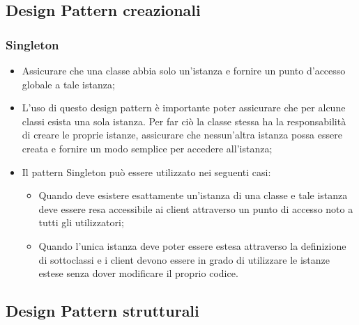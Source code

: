 \subsection{Design Pattern creazionali}
\subsubsection{Singleton} 
\begin{itemize}
\item {} Assicurare che una classe abbia solo un'istanza e fornire un punto d'accesso globale a tale istanza;
\item {} L'uso di questo design pattern è importante poter assicurare che per alcune classi esista una sola istanza. Per far ciò la classe stessa ha la responsabilità di creare le proprie istanze, assicurare che nessun'altra istanza possa essere creata e fornire un modo semplice per accedere all'istanza;
\item {} Il pattern Singleton può essere utilizzato nei seguenti casi:
\begin{itemize}
\item Quando deve esistere esattamente un'istanza di una classe e tale istanza deve essere resa accessibile ai client attraverso un punto di accesso noto a tutti gli utilizzatori;
\item Quando l'unica istanza deve poter essere estesa attraverso la definizione di sottoclassi e i client devono essere in grado di utilizzare le istanze estese senza dover modificare il proprio codice.
\end{itemize}
\end{itemize}

\subsection{Design Pattern strutturali} 
